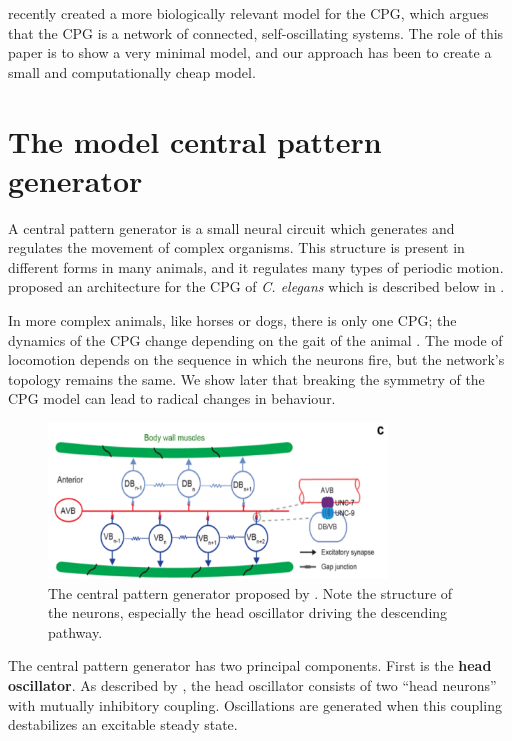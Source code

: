 \documentclass[
    11pt,
]{article}
\begin{document}
\citet{olivares2019} recently created a more biologically relevant model for the CPG, which argues that the CPG is a network of connected, self-oscillating systems.  The role of this paper is to show a very minimal model, and our approach has been to create a small and computationally cheap model.

\section{The model central pattern generator}


A central pattern generator is a small neural circuit which generates and regulates the movement of complex organisms.  This structure is present in different forms in many animals, and it regulates many types of periodic motion.  \citet{xu2018} proposed an architecture for the CPG of \emph{C. elegans} which is described below in .

In more complex animals, like horses or dogs, there is only one CPG; the dynamics of the CPG change depending on the gait of the animal \citep{collins1994}.  The mode of locomotion depends on the sequence in which the neurons fire, but the network's topology remains the same.  We show later that breaking the symmetry of the CPG model can lead to radical changes in behaviour.

\begin{figure}[h!]
    \label{fig: xu_cpg}
    \centering
    \includegraphics[width=9cm]{figures/xu_cpg/xu_cpg.png}
    \caption{The central pattern generator proposed by \citet{xu2018}.  Note the structure of the neurons, especially the head oscillator driving the descending pathway.}
\end{figure}

The central pattern generator has two principal components.  First is the \textbf{head oscillator}. As described by \citet{gjorgjieva2014}, the head oscillator consists of two “head neurons” with mutually inhibitory coupling.  Oscillations are generated when this coupling destabilizes an excitable steady state.
\end{document}
